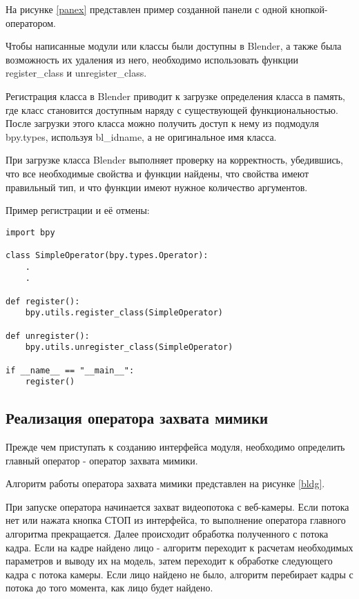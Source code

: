 На рисунке \ref{panex} представлен пример созданной панели с одной кнопкой-оператором.


Чтобы написанные модули или классы были доступны в Blender, а также была возможность их удаления из него, необходимо использовать функции register\_class и unregister\_class.

Регистрация класса в Blender приводит к загрузке определения класса в память, где класс становится доступным наряду с существующей функциональностью. После загрузки этого класса можно получить доступ к нему из подмодуля bpy.types, используя bl\_idname, а не оригинальное имя класса.

При загрузке класса Blender выполняет проверку на корректность, убедившись, что все необходимые свойства и функции найдены, что свойства имеют правильный тип, и что функции имеют нужное количество аргументов.

Пример регистрации и её отмены:
\begin{lstlisting}
import bpy

class SimpleOperator(bpy.types.Operator):
	.
	.

def register():
	bpy.utils.register_class(SimpleOperator)

def unregister():
	bpy.utils.unregister_class(SimpleOperator)

if __name__ == "__main__":
	register()
\end{lstlisting}


\subsection {Реализация оператора захвата мимики}

Прежде чем приступать к созданию интерфейса модуля, необходимо определить главный оператор - оператор захвата мимики.

Алгоритм работы оператора захвата мимики представлен на рисунке \ref{bldg}.

При запуске оператора начинается захват видеопотока с веб-камеры. Если потока нет или нажата кнопка СТОП из интерфейса, то выполнение оператора главного алгоритма прекращается. Далее происходит обработка полученного с потока кадра. Если на кадре найдено лицо - алгоритм переходит к расчетам необходимых параметров и выводу их на модель, затем переходит к обработке следующего кадра с потока камеры. Если лицо найдено не было, алгоритм перебирает кадры с потока до того момента, как лицо будет найдено. 

